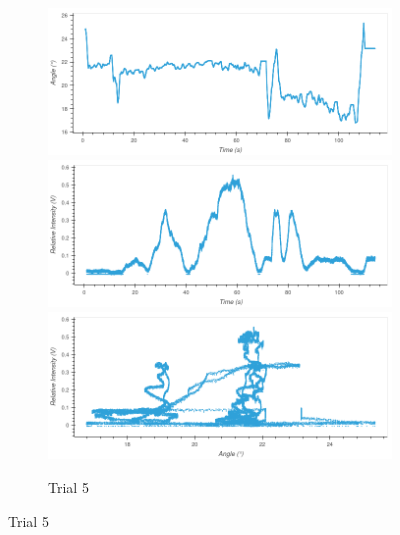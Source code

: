 \begin{figure}
\begin{subfigure}{1.0\textwidth}
\caption*{Trial 5}
\includegraphics[width=\plotwidth]{plots/t6-time-angle.png}
\includegraphics[width=\plotwidth]{plots/t6-time-intensity.png}
\includegraphics[width=\plotwidth]{plots/t6-angle-intensity.png}
\end{subfigure}




\end{figure}
